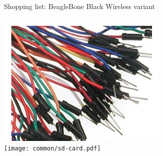 \begin{frame}[fragile]{Shopping list: BeagleBone Black Wireless variant}
\begin{columns}
\begin{center}
      \includegraphics[height=0.15\textheight]{common/jumper-wires.jpg} \\
      \texttt{[image: common/sd-card.pdf]}
    \end{center}
  \end{columns}
\end{frame}

